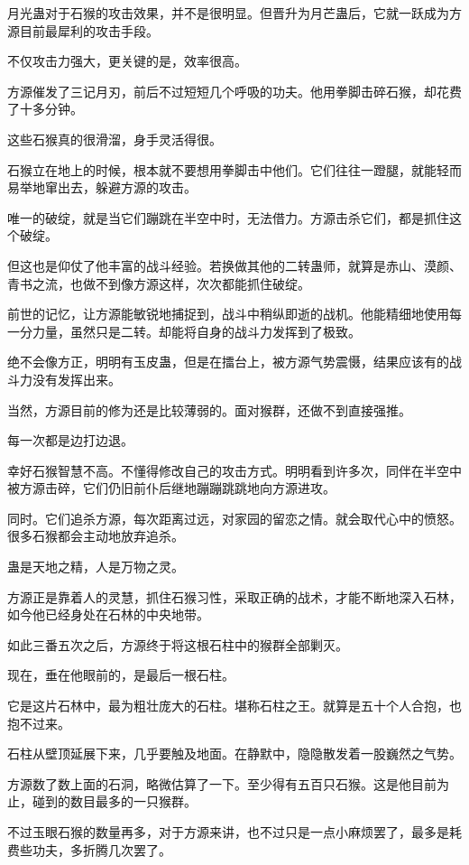 \begin{this_body}
月光蛊对于石猴的攻击效果，并不是很明显。但晋升为月芒蛊后，它就一跃成为方源目前最犀利的攻击手段。

不仅攻击力强大，更关键的是，效率很高。

方源催发了三记月刃，前后不过短短几个呼吸的功夫。他用拳脚击碎石猴，却花费了十多分钟。

这些石猴真的很滑溜，身手灵活得很。

石猴立在地上的时候，根本就不要想用拳脚击中他们。它们往往一蹬腿，就能轻而易举地窜出去，躲避方源的攻击。

唯一的破绽，就是当它们蹦跳在半空中时，无法借力。方源击杀它们，都是抓住这个破绽。

但这也是仰仗了他丰富的战斗经验。若换做其他的二转蛊师，就算是赤山、漠颜、青书之流，也做不到像方源这样，次次都能抓住破绽。

前世的记忆，让方源能敏锐地捕捉到，战斗中稍纵即逝的战机。他能精细地使用每一分力量，虽然只是二转。却能将自身的战斗力发挥到了极致。

绝不会像方正，明明有玉皮蛊，但是在擂台上，被方源气势震慑，结果应该有的战斗力没有发挥出来。

当然，方源目前的修为还是比较薄弱的。面对猴群，还做不到直接强推。

每一次都是边打边退。

幸好石猴智慧不高。不懂得修改自己的攻击方式。明明看到许多次，同伴在半空中被方源击碎，它们仍旧前仆后继地蹦蹦跳跳地向方源进攻。

同时。它们追杀方源，每次距离过远，对家园的留恋之情。就会取代心中的愤怒。很多石猴都会主动地放弃追杀。

蛊是天地之精，人是万物之灵。

方源正是靠着人的灵慧，抓住石猴习性，采取正确的战术，才能不断地深入石林，如今他已经身处在石林的中央地带。

如此三番五次之后，方源终于将这根石柱中的猴群全部剿灭。

现在，垂在他眼前的，是最后一根石柱。

它是这片石林中，最为粗壮庞大的石柱。堪称石柱之王。就算是五十个人合抱，也抱不过来。

石柱从壁顶延展下来，几乎要触及地面。在静默中，隐隐散发着一股巍然之气势。

方源数了数上面的石洞，略微估算了一下。至少得有五百只石猴。这是他目前为止，碰到的数目最多的一只猴群。

不过玉眼石猴的数量再多，对于方源来讲，也不过只是一点小麻烦罢了，最多是耗费些功夫，多折腾几次罢了。


\end{this_body}
